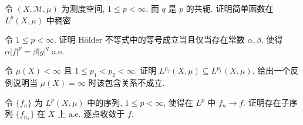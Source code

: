 \documentclass[../../main.tex]{subfiles}
\begin{document}
\begin{exercise}\label{exercise:ch19-02}
令 $(X,\mathcal{M},\mu)$ 为测度空间, $1\leqslant p<\infty$, 而 $q$ 是 $p$ 的共轭. 证明简单函数在 $L^{p}(X,\mu)$ 中稠密.
\end{exercise}

\begin{exercise}\label{exercise:ch19-03}
令 $1\leqslant p<\infty$. 证明 H\"older 不等式中的等号成立当且仅当存在常数 $\alpha,\beta$, 使得 $\alpha|f|^{p}=\beta|g|^{q}$ a.e.
\end{exercise}

\begin{exercise}\label{exercise:ch19-04}
令 $\mu(X)<\infty$ 且 $1\leqslant p_{1}<p_{2}<\infty$. 证明 $L^{p_{2}}(X,\mu)\subseteq L^{p_{1}}(X,\mu)$. 给出一个反例说明当 $\mu(X)=\infty$ 时该包含关系不成立.
\end{exercise}

\begin{exercise}\label{exercise:ch19-05}
令 $\{f_{n}\}$ 为 $L^{p}(X,\mu)$ 中的序列, $1\leqslant p<\infty$, 使得在 $L^{p}$ 中 $f_{n}\to f$. 证明存在子序列 $\{f_{n_{k}}\}$ 在 $X$ 上 a.e. 逐点收敛于 $f$.
\end{exercise}
\end{document}
